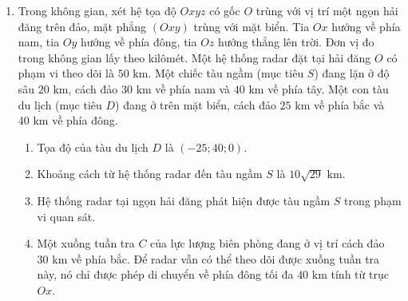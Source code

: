 \documentclass[12pt]{article}
\begin{document}
\begin{enumerate}[label=\textbf{Câu \arabic*:}, leftmargin=*]
\begin{figure}[H]
		\end{figure}
		
		\begin{enumerate}[label=\alph*)]
			\item Với hệ tọa độ đã chọn, tọa độ của chiếc flycam thứ nhất là $(6; 8; 10)$.
			\item Với hệ tọa độ đã chọn, tọa độ của chiếc flycam thứ hai là $(3; -4; 2)$.
			\item Khoảng cách từ điểm điều khiển $O$ đến chiếc flycam thứ nhất là $10\sqrt{2}\text{ km}$.
			\item Khoảng cách giữa hai chiếc flycam đang bay trên không là $17\text{ km}$.
		\end{enumerate}
		
		\vspace{3mm}
		\item Trong không gian, xét hệ tọa độ $Oxyz$ có gốc $O$ trùng với vị trí một ngọn hải đăng trên đảo, mặt phẳng $(Oxy)$ trùng với mặt biển. Tia $Ox$ hướng về phía nam, tia $Oy$ hướng về phía đông, tia $Oz$ hướng thẳng lên trời. Đơn vị đo trong không gian lấy theo kilômét. Một hệ thống radar đặt tại hải đăng $O$ có phạm vi theo dõi là $50\text{ km}$. Một chiếc tàu ngầm (mục tiêu $S$) đang lặn ở độ sâu $20\text{ km}$, cách đảo $30\text{ km}$ về phía nam và $40\text{ km}$ về phía tây. Một con tàu du lịch (mục tiêu $D$) đang ở trên mặt biển, cách đảo $25\text{ km}$ về phía bắc và $40\text{ km}$ về phía đông.
		\begin{enumerate}[label=\alph*)]
			\item Tọa độ của tàu du lịch $D$ là $(-25; 40; 0)$.
			\item Khoảng cách từ hệ thống radar đến tàu ngầm $S$ là $10\sqrt{29}\text{ km}$.
			\item Hệ thống radar tại ngọn hải đăng phát hiện được tàu ngầm $S$ trong phạm vi quan sát.
			\item Một xuồng tuần tra $C$ của lực lượng biên phòng đang ở vị trí cách đảo $30\text{ km}$ về phía bắc. Để radar vẫn có thể theo dõi được xuồng tuần tra này, nó chỉ được phép di chuyển về phía đông tối đa $40\text{ km}$ tính từ trục $Ox$.
		\end{enumerate}
		

\end{enumerate}
\end{document}

